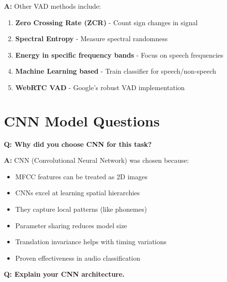 \documentclass[a4paper,12pt]{article}
\newcommand{\vivaQ}[1]{\textcolor{questioncolor}{\textbf{Q: #1}}}
\newcommand{\vivaA}[1]{\textcolor{answercolor}{\textbf{A:}} #1}
\begin{document}
\vivaA{Other VAD methods include:
\begin{enumerate}
    \item \textbf{Zero Crossing Rate (ZCR)} - Count sign changes in signal
    \item \textbf{Spectral Entropy} - Measure spectral randomness
    \item \textbf{Energy in specific frequency bands} - Focus on speech frequencies
    \item \textbf{Machine Learning based} - Train classifier for speech/non-speech
    \item \textbf{WebRTC VAD} - Google's robust VAD implementation
\end{enumerate}}

\section{CNN Model Questions}

\vivaQ{Why did you choose CNN for this task?}

\vivaA{CNN (Convolutional Neural Network) was chosen because:
\begin{itemize}
    \item MFCC features can be treated as 2D images
    \item CNNs excel at learning spatial hierarchies
    \item They capture local patterns (like phonemes)
    \item Parameter sharing reduces model size
    \item Translation invariance helps with timing variations
    \item Proven effectiveness in audio classification
\end{itemize}}

\vspace{0.5cm}

\vivaQ{Explain your CNN architecture.}
\end{document}
